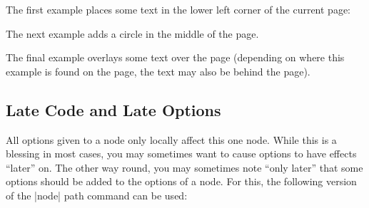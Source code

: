 The first example places some text in the lower left corner of the current
page:
%
\begin{codeexample}[]
\end{codeexample}

The next example adds a circle in the middle of the page.
%
\begin{codeexample}[]
\end{codeexample}

The final example overlays some text over the page (depending on where this
example is found on the page, the text may also be behind the page).
%
\begin{codeexample}[]
\end{codeexample}


\subsection{Late Code and Late Options}
\label{section-node-also}

All options given to a node only locally affect this one node. While this is a
blessing in most cases, you may sometimes want to cause options to have effects
``later'' on. The other way round, you may sometimes note ``only later'' that
some options should be added to the options of a node. For this, the following
version of the |node| path command can be used:

